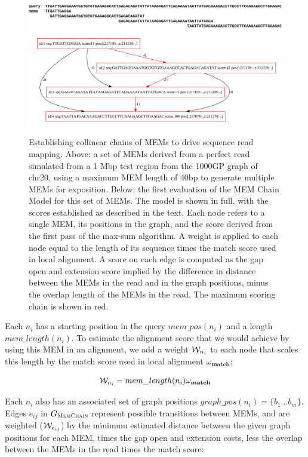 \begin{figure}[htbp!]
\centering
\includegraphics[width=1.0\textwidth]{Chapter2/Figs/memchain_dag.pdf}
\caption[The MEM Chain Model]{
  Establishing collinear chains of MEMs to drive sequence read mapping.
  Above: a set of MEMs derived from a perfect read simulated from a 1 Mbp test region from the 1000GP graph of chr20, using a maximum MEM length of 40bp to generate multiple MEMs for exposition.
  Below: the first evaluation of the MEM Chain Model for this set of MEMs.
  The model is shown in full, with the scores established as described in the text.
  Each node refers to a single MEM, its positions in the graph, and the score derived from the first pass of the max-sum algorithm.
  A weight is applied to each node equal to the length of its sequence times the match score used in local alignment.
  A score on each edge is computed as the gap open and extension score implied by the difference in distance between the MEMs in the read and in the graph positions, minus the overlap length of the MEMs in the read.
  The maximum scoring chain is shown in red.
}
\label{fig:memchain_model}
\end{figure}

Each $n_i$ has a starting position in the query $mem\_pos(n_i)$ and a length $mem\_length(n_i)$.
To estimate the alignment score that we would achieve by using this MEM in an alignment, we add a weight ${\cal W}_{n_i}$ to each node that scales this length by the match score used in local alignment $\omega_\textbf{match}$:

\begin{equation}
  {\cal W}_{n_i} = mem\_length(n_i) \omega_\textbf{match}
\end{equation}

Each $n_i$ also has an associated set of graph positions $graph\_pos(n_i) = \{ b_1 \ldots b_m \}$.
Edges $e_{ij}$ in $G_\textsc{MemChain}$ represent possible transitions between MEMs, and are weighted (${\cal W}_{e_{ij}}$) by the minimum estimated distance between the given graph positions for each MEM, times the gap open and extension costs, less the overlap between the MEMs in the read times the match score:

